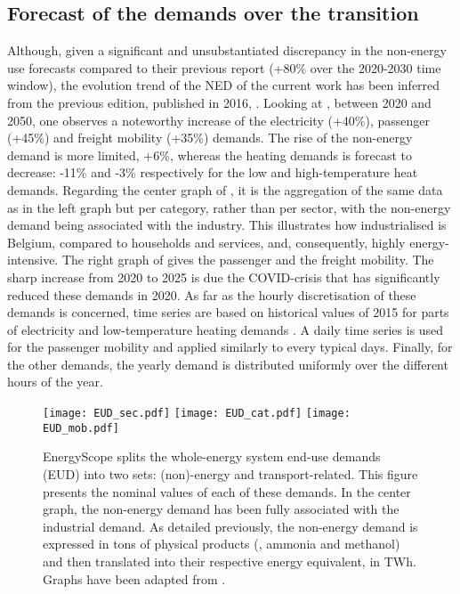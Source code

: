 \subsection{Forecast of the demands over the transition}
\label{subsec:cs:EUD_forecast}
Although, given a significant and unsubstantiated discrepancy in the non-energy use forecasts compared to their previous report (\ie +80\% over the 2020-2030 time window), the evolution trend of the \gls{NED} of the current work has been inferred from the previous edition, published in 2016, \cite{EuropeanCommission2016}. Looking at , between 2020 and 2050, one observes a noteworthy increase of the electricity (+40\%), passenger (+45\%) and freight mobility (+35\%) demands. The rise of the non-energy demand is more limited, \ie +6\%, whereas the heating demands is forecast to decrease: -11\% and -3\% respectively for the low and high-temperature heat demands. Regarding the center graph of , it is the aggregation of the same data as in the left graph but per category, rather than per sector, with the non-energy demand being associated with the industry. This illustrates how industrialised is Belgium, compared to households and services, and, consequently, highly energy-intensive. The right graph of  gives the passenger and the freight mobility. The sharp increase from 2020 to 2025 is due the COVID-crisis that has significantly reduced these demands in 2020. As far as the hourly discretisation of these demands is concerned, time series are based on historical values of 2015 for parts of electricity and low-temperature heating demands \cite{Limpens2020}. A daily time series is used for the passenger mobility and applied similarly to every typical days. Finally, for the other demands, the yearly demand is distributed uniformly over the different hours of the year.

\begin{figure}[htbp!]
\centering
\texttt{[image: EUD\_sec.pdf]}
\texttt{[image: EUD\_cat.pdf]}
\texttt{[image: EUD\_mob.pdf]}
\caption{EnergyScope splits the whole-energy system end-use demands (EUD) into two sets: (non)-energy and transport-related. This figure presents the nominal values of each of these demands. In the center graph, the non-energy demand has been fully associated with the industrial demand. As detailed previously, the non-energy demand is expressed in tons of physical products (\ie {}, ammonia and methanol) and then translated into their respective energy equivalent, in TWh. Graphs have been adapted from \cite{limpens2024pathway}.}
\label{fig:cs_demands}
\end{figure}


